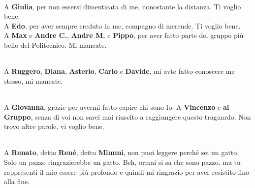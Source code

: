 \documentclass[main]{subfiles}
\begin{document}
\noindent\\
A \textbf{Giulia}, per non essersi dimenticata di me, nonostante la distanza. Ti voglio bene.
\noindent\\
A \textbf{Edo}, per aver sempre creduto in me, compagno di merende. Ti voglio bene.
\noindent\\ 
A \textbf{Max} e \textbf{Andre C.}, \textbf{Andre M.} e \textbf{Pippo}, per aver fatto parte 
del gruppo più bello del Politecnico. Mi mancate.

\noindent\\
A \textbf{Ruggero}, \textbf{Diana}, \textbf{Asterio}, \textbf{Carlo} e \textbf{Davide},
mi avte fatto conoscere me stesso, mi mancate.

\noindent\\
A \textbf{Giovanna}, grazie per avermi fatto capire chi sono Io.
A \textbf{Vincenzo} e \textbf{al Gruppo}, senza di voi non sarei mai riuscito a raggiungere questo traguardo.
Non trovo altre parole, vi voglio bene.

\noindent\\
A \textbf{Renato}, detto \textbf{René}, detto \textbf{Mimmi}, non puoi leggere perché sei un gatto. Solo un pazzo ringrazierebbe un gatto.
Beh, ormai si sa che sono pazzo, ma tu rappresenti il mio essere più profondo e quindi mi ringrazio per aver resistito 
fino alla fine. 
\end{document}
